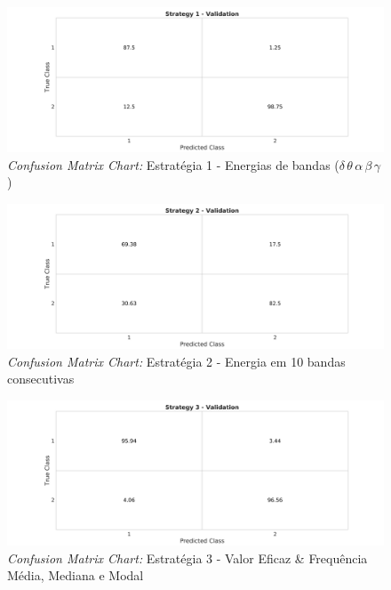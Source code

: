 \documentclass{article}
\begin{document}
\begin{figure}[H]
	\begin{center}
		\includegraphics[scale=0.2]{../Q5_e-val1.png}
		\caption{\textit{Confusion Matrix Chart:} Estratégia 1 - Energias de bandas ($\delta\, \theta\, \alpha\, \beta\, \gamma$)}
		\label{fig:Q5_e-val1}
	\end{center}
\end{figure}

\begin{figure}[H]
	\begin{center}
		\includegraphics[scale=0.2]{../Q5_e-val2.png}
		\caption{\textit{Confusion Matrix Chart:} Estratégia 2 - Energia em 10 bandas consecutivas}
		\label{fig:Q5_e-val2}
	\end{center}
\end{figure}

\begin{figure}[H]
	\begin{center}
		\includegraphics[scale=0.2]{../Q5_e-val3.png}
		\caption{\textit{Confusion Matrix Chart:} Estratégia 3 - Valor Eficaz \& Frequência Média, Mediana e Modal}
		\label{fig:Q5_e-val3}
	\end{center}
\end{figure}
\end{document}

